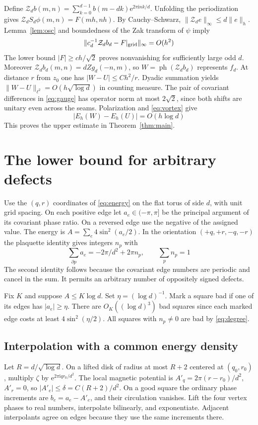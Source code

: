\documentclass[11pt,reqno]{amsart}
\newcommand{\ph}{\operatorname{ph}}
\newcommand{\ii}{\mathrm i}
\newcommand{\e}{\mathrm e}
\begin{document}
Define $\mathcal Z_db(m,n)=\sum_{k=0}^{d-1}b(m-dk)\e^{2\pi\ii nk/d}$. Unfolding the periodization gives $\mathcal Z_d S_d\phi(m,n)=F(mh,nh)$. By Cauchy--Schwarz, $\|\mathcal Z_de\|_\infty\le d\|e\|_h$. Lemma~\ref{lem:osc} and boundedness of the Zak transform of $\psi$ imply
\[
 \|c_d^{-1}\mathcal Z_db_d-F|_{\rm grid}\|_\infty=O(h^2)
\]
The lower bound $|F|\ge ch/\sqrt2$ proves nonvanishing for sufficiently large odd $d$. Moreover $\mathcal Z_db_d(m,n)=dZg_d(-n,m)$, so $W=\ph(\mathcal Z_db_d)$ represents $f_d$. At distance $r$ from $z_0$ one has $|W-U|\le Ch^2/r$. Dyadic summation yields $\|W-U\|_{\ell^2}=O(h\sqrt{\log d})$ in counting measure. The pair of covariant differences in \eqref{eq:gauge} has operator norm at most $2\sqrt2$, since both shifts are unitary even across the seams. Polarization and \eqref{eq:vortex} give
\[
 |E_h(W)-E_h(U)|=O(h\log d)
\]
This proves the upper estimate in Theorem~\ref{thm:main}.

\section{The lower bound for arbitrary defects}
Use the $(q,r)$ coordinates of \eqref{eq:energy} on the flat torus of side $d$, with unit grid spacing. On each positive edge let $a_e\in(-\pi,\pi]$ be the principal argument of its covariant phase ratio. On a reversed edge use the negative of the assigned value. The energy is $A=\sum_e4\sin^2(a_e/2)$. In the orientation $(+q,+r,-q,-r)$ the plaquette identity gives integers $n_p$ with
\begin{equation}\label{eq:degree}
 \sum_{\partial p}a_e=-2\pi/d^2+2\pi n_p,\qquad \sum_p n_p=1
\end{equation}
The second identity follows because the covariant edge numbers are periodic and cancel in the sum. It permits an arbitrary number of oppositely signed defects.

Fix $K$ and suppose $A\le K\log d$. Set $\eta=(\log d)^{-1}$. Mark a square bad if one of its edges has $|a_e|\ge\eta$. There are $O_K((\log d)^3)$ bad squares since each marked edge costs at least $4\sin^2(\eta/2)$. All squares with $n_p\ne0$ are bad by \eqref{eq:degree}.

\subsection{Interpolation with a common energy density}
Let $R=d/\sqrt{\log d}$. On a lifted disk of radius at most $R+2$ centered at $(q_0,r_0)$, multiply $\zeta$ by $\e^{2\pi\ii qr_0/d^2}$. The local magnetic potential is $A'_q=2\pi(r-r_0)/d^2$, $A'_r=0$, so $|A'_e|\le\delta=C(R+2)/d^2$. On a good square the ordinary phase increments are $b_e=a_e-A'_e$, and their circulation vanishes. Lift the four vertex phases to real numbers, interpolate bilinearly, and exponentiate. Adjacent interpolants agree on edges because they use the same increments there.
\end{document}

